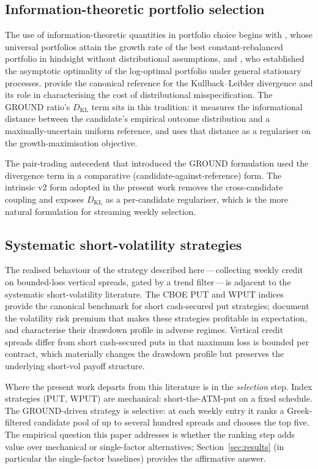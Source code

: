 \documentclass[11pt]{article}
\begin{document}
\subsection{Information-theoretic portfolio selection}

The use of information-theoretic quantities in portfolio choice begins with
\citet{cover1991universal}, whose universal portfolios attain the growth rate
of the best constant-rebalanced portfolio in hindsight without distributional
assumptions, and \citet{algoet1988asymptotic}, who established the asymptotic
optimality of the log-optimal portfolio under general stationary processes.
\citet{cover2006} provide the canonical reference for the
Kullback--Leibler divergence and its role in characterising the cost of
distributional misspecification. The GROUND ratio's $D_{\mathrm{KL}}$ term
sits in this tradition: it measures the informational distance between the
candidate's empirical outcome distribution and a maximally-uncertain uniform
reference, and uses that distance as a regulariser on the
growth-maximisation objective.

The pair-trading antecedent \citep{mercurio2020} that introduced the GROUND
formulation used the divergence term in a comparative
(candidate-against-reference) form. The intrinsic v2 form adopted in the
present work removes the cross-candidate coupling and exposes
$D_{\mathrm{KL}}$ as a per-candidate regulariser, which is the more natural
formulation for streaming weekly selection.

\subsection{Systematic short-volatility strategies}

The realised behaviour of the strategy described here\,---\,collecting weekly
credit on bounded-loss vertical spreads, gated by a trend filter\,---\,is
adjacent to the systematic short-volatility literature. The CBOE PUT and
WPUT indices \citep{cboe_put} provide the canonical benchmark for short
cash-secured put strategies; \citet{israelovnielsen2014} document the
volatility risk premium that makes these strategies profitable in
expectation, and \citet{israelov2017} characterise their drawdown profile in
adverse regimes. Vertical credit spreads differ from short cash-secured puts
in that maximum loss is bounded per contract, which materially changes the
drawdown profile but preserves the underlying short-vol payoff structure.

Where the present work departs from this literature is in the
\emph{selection} step. Index strategies (PUT, WPUT) are mechanical:
short-the-ATM-put on a fixed schedule. The GROUND-driven strategy is
selective: at each weekly entry it ranks a Greek-filtered candidate pool of
up to several hundred spreads and chooses the top five. The empirical
question this paper addresses is whether the ranking step adds value over
mechanical or single-factor alternatives; Section~\ref{sec:results}
(in particular the single-factor baselines) provides the affirmative answer.
\end{document}
